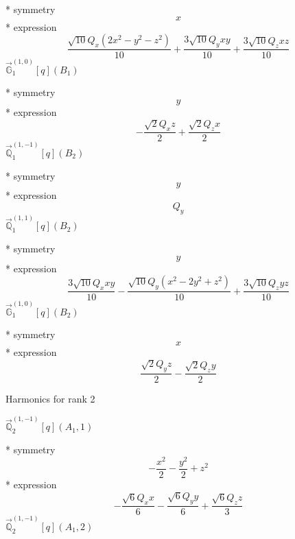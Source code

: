 \documentclass[fleqn,8pt]{jsarticle}
\begin{document}
\noindent\quad ** symmetry
\begin{dmath*}
x
\end{dmath*}
\noindent\quad ** expression
\begin{dmath*}
\frac{\sqrt{10} Q_{x} \left(2 x^{2} - y^{2} - z^{2}\right)}{10} + \frac{3 \sqrt{10} Q_{y} x y}{10} + \frac{3 \sqrt{10} Q_{z} x z}{10}
\end{dmath*}
\noindent\quad $\vec{\mathbb{G}}_{1}^{(1,0)}[q](B_{1})$

\noindent\quad ** symmetry
\begin{dmath*}
y
\end{dmath*}
\noindent\quad ** expression
\begin{dmath*}
- \frac{\sqrt{2} Q_{x} z}{2} + \frac{\sqrt{2} Q_{z} x}{2}
\end{dmath*}
\noindent\quad $\vec{\mathbb{Q}}_{1}^{(1,-1)}[q](B_{2})$

\noindent\quad ** symmetry
\begin{dmath*}
y
\end{dmath*}
\noindent\quad ** expression
\begin{dmath*}
Q_{y}
\end{dmath*}
\noindent\quad $\vec{\mathbb{Q}}_{1}^{(1,1)}[q](B_{2})$

\noindent\quad ** symmetry
\begin{dmath*}
y
\end{dmath*}
\noindent\quad ** expression
\begin{dmath*}
\frac{3 \sqrt{10} Q_{x} x y}{10} - \frac{\sqrt{10} Q_{y} \left(x^{2} - 2 y^{2} + z^{2}\right)}{10} + \frac{3 \sqrt{10} Q_{z} y z}{10}
\end{dmath*}
\noindent\quad $\vec{\mathbb{G}}_{1}^{(1,0)}[q](B_{2})$

\noindent\quad ** symmetry
\begin{dmath*}
x
\end{dmath*}
\noindent\quad ** expression
\begin{dmath*}
\frac{\sqrt{2} Q_{y} z}{2} - \frac{\sqrt{2} Q_{z} y}{2}
\end{dmath*}

\noindent * Harmonics for rank 2

\noindent\quad $\vec{\mathbb{Q}}_{2}^{(1,-1)}[q](A_{1},1)$

\noindent\quad ** symmetry
\begin{dmath*}
- \frac{x^{2}}{2} - \frac{y^{2}}{2} + z^{2}
\end{dmath*}
\noindent\quad ** expression
\begin{dmath*}
- \frac{\sqrt{6} Q_{x} x}{6} - \frac{\sqrt{6} Q_{y} y}{6} + \frac{\sqrt{6} Q_{z} z}{3}
\end{dmath*}
\noindent\quad $\vec{\mathbb{Q}}_{2}^{(1,-1)}[q](A_{1},2)$
\end{document}
